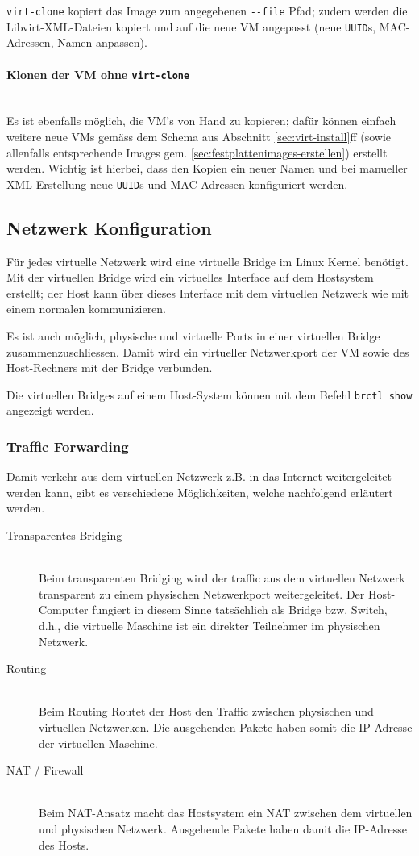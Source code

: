 \lstinline|virt-clone| kopiert das Image zum angegebenen \lstinline|--file| Pfad; zudem werden die Libvirt-XML-Dateien kopiert und auf die neue VM angepasst (neue \lstinline|UUID|s, MAC-Adressen, Namen anpassen).

\paragraph{Klonen der VM ohne \lstinline|virt-clone|} \hfill \\
Es ist ebenfalls möglich, die VM's von Hand zu kopieren; dafür können einfach weitere neue VMs gemäss dem Schema aus Abschnitt \ref{sec:virt-install}ff (sowie allenfalls entsprechende Images gem. \ref{sec:festplattenimages-erstellen}) erstellt werden. Wichtig ist hierbei, dass den Kopien ein neuer Namen und bei manueller XML-Erstellung neue \lstinline|UUID|s und MAC-Adressen konfiguriert werden.


\subsection{Netzwerk Konfiguration}
Für jedes virtuelle Netzwerk wird eine virtuelle Bridge im Linux Kernel benötigt. Mit der virtuellen Bridge wird ein virtuelles Interface auf dem Hostsystem erstellt; der Host kann über dieses Interface mit dem virtuellen Netzwerk wie mit einem normalen kommunizieren.

Es ist auch möglich, physische und virtuelle Ports in einer virtuellen Bridge zusammenzuschliessen. Damit wird ein virtueller Netzwerkport der VM sowie des Host-Rechners mit der Bridge verbunden.

Die virtuellen Bridges auf einem Host-System können mit dem Befehl \lstinline|brctl show| angezeigt werden.

\subsubsection{Traffic Forwarding}
Damit verkehr aus dem virtuellen Netzwerk z.B. in das Internet weitergeleitet werden kann, gibt es verschiedene Möglichkeiten, welche nachfolgend erläutert werden.

\begin{description}
	\item[Transparentes Bridging] \hfill \\
		Beim transparenten Bridging wird der traffic aus dem virtuellen Netzwerk transparent zu einem physischen Netzwerkport weitergeleitet. Der Host-Computer fungiert in diesem Sinne tatsächlich als Bridge bzw. Switch, d.h., die virtuelle Maschine ist ein direkter Teilnehmer im physischen Netzwerk.
	\item[Routing] \hfill \\
		Beim Routing Routet der Host den Traffic zwischen physischen und virtuellen Netzwerken. Die ausgehenden Pakete haben somit die IP-Adresse der virtuellen Maschine.
	\item[NAT / Firewall] \hfill \\
		Beim NAT-Ansatz macht das Hostsystem ein NAT zwischen dem virtuellen und physischen Netzwerk. Ausgehende Pakete haben damit die IP-Adresse des Hosts.
\end{description}


